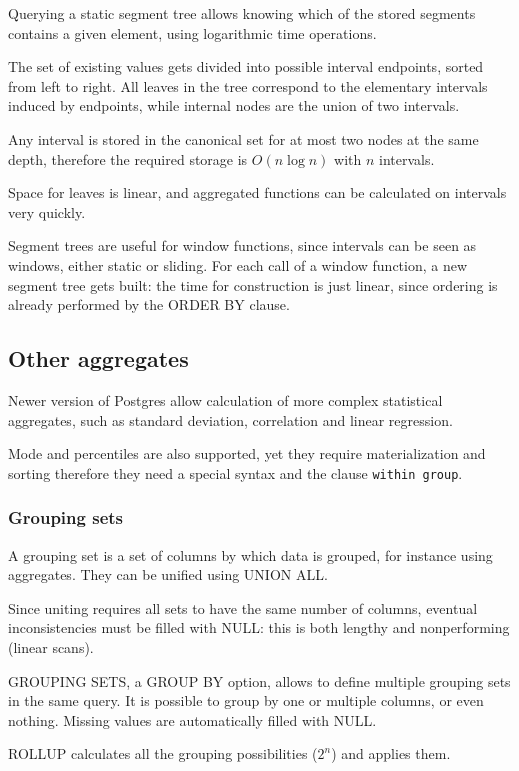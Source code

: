 Querying a static segment tree allows knowing which of the stored segments contains a given element, using logarithmic time operations.

The set of existing values gets divided into possible interval endpoints, sorted from left to right. All leaves in the tree correspond to the elementary intervals induced by endpoints, while internal nodes are the union of two intervals. 

Any interval is stored in the canonical set for at most two nodes at the same depth, therefore the required storage is $O(n \log n)$ with $n$ intervals.

Space for leaves is linear, and aggregated functions can be calculated on intervals very quickly. 

Segment trees are useful for window functions, since intervals can be seen as windows, either static or sliding. For each call of a window function, a new segment tree gets built: the time for construction is just linear, since ordering is already performed by the ORDER BY clause.

\subsection{Other aggregates}
Newer version of Postgres allow calculation of more complex statistical aggregates, such as standard deviation, correlation and linear regression.

Mode and percentiles are also supported, yet they require materialization and sorting therefore they need a special syntax and the clause \texttt{within group}.

\subsubsection{Grouping sets}
A grouping set is a set of columns by which data is grouped, for instance using aggregates. They can be unified using UNION ALL.

Since uniting requires all sets to have the same number of columns, eventual inconsistencies must be filled with NULL: this is both lengthy and nonperforming (linear scans).

GROUPING SETS, a GROUP BY option, allows to define multiple grouping sets in the same query. It is possible to group by one or multiple columns, or even nothing. Missing values are automatically filled with NULL.

ROLLUP calculates all the grouping possibilities ($2^n$) and applies them. 

